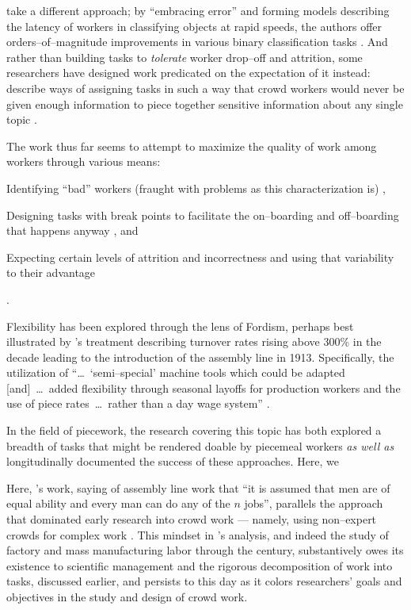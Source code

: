 \documentclass[trackingWork]{subfiles}
\begin{document}
\citeauthor{embracingErrorKrishna} take a different approach;
by ``embracing error'' and forming models describing the latency of workers in classifying objects at rapid speeds,
the authors offer orders--of--magnitude improvements
in various binary classification tasks
\cite{embracingErrorKrishna}.
And rather than building tasks to \textit{tolerate} worker drop--off and attrition,
some researchers have designed work predicated on the expectation of it instead:
\citeauthor{sensitiveTasks} describe ways of assigning tasks in such a way that
crowd workers would never be given enough information to piece together sensitive information about
any single topic
\cite{sensitiveTasks}.

The work thus far seems to attempt to maximize the quality of work among workers through various means:
\begin{inlinelist}
  \item Identifying ``bad'' workers (fraught with problems as this characterization is) \cite{MaliciousCrowdworkersGadiraju},
  \item Designing tasks with break points to facilitate the on--boarding and off--boarding that happens anyway \cite{cheng2015break}, and
  \item Expecting certain levels of attrition and incorrectness and using that variability to their advantage \cite{embracingErrorKrishna}
\end{inlinelist}.


Flexibility has been explored through the lens of Fordism, perhaps best illustrated by
\citeauthor{tolliday1986between}'s treatment describing
turnover rates rising above 300\% in the decade leading to the introduction of the assembly line in 1913.
Specifically, the utilization of ``\dots~`semi--special' machine tools which could be adapted
[and]~\dots~added flexibility through seasonal layoffs for production workers and the use of
piece rates~\dots~rather than a day wage system''
\cite{tolliday1986between}.

In the field of piecework,
the research covering this topic has both explored
a breadth of tasks that might be rendered doable by piecemeal workers
\textit{as well as} longitudinally documented the success of these approaches.
Here, we 













Here, \citeauthor{hu1961parallel}'s work,
saying of assembly line work that
``it is assumed that men are of equal ability and every man can do any of the $n$ jobs'',
parallels the approach that dominated early research into crowd work
--- namely, using non--expert crowds for complex work
\cite{hu1961parallel}.
This mindset in \citeauthor{hu1961parallel}'s analysis,
and indeed the study of factory and mass manufacturing labor through the  century,
substantively owes its existence to scientific management
and the rigorous decomposition of work into tasks, discussed earlier,
and persists to this day as it colors
researchers' goals and objectives in the study and design of crowd work.
\end{document}
